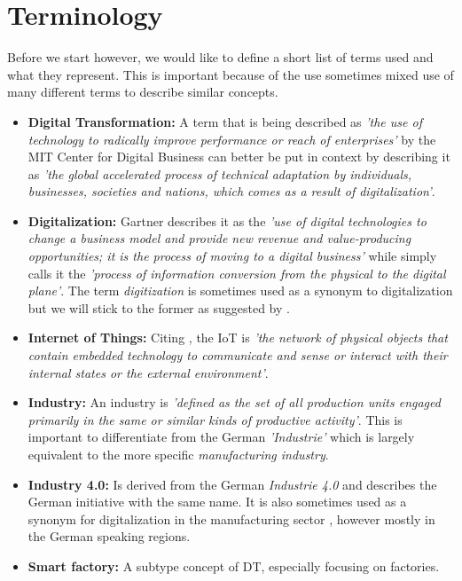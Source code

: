 \section{Terminology}
Before we start however, we would like to define a short list of terms used and what they represent. This is important because of the use sometimes mixed use of many different terms to describe similar concepts.



\begin{itemize}
  \item \textbf{Digital Transformation:} A term that is being described as \emph{'the use of technology to radically improve performance or reach of enterprises'}\cite{westerman2011digital} by the MIT Center for Digital Business can better be put in context by describing it as \emph{'the global accelerated process of technical adaptation by individuals, businesses, societies and nations, which comes as a result of digitalization'}\cite{bonnect2014leading,khan-digital:2016}.

  \item \textbf{Digitalization:} Gartner describes it as the \emph{'use of digital technologies to change a business model and provide new revenue and value-producing opportunities; it is the process of moving to a digital business'} while \citeauthor{khan-digital:2016} simply calls it the \emph{'process of information conversion from the physical to the digital plane'}. The term \emph{digitization} is sometimes used as a synonym to digitalization but we will stick to the former as suggested by \citeauthor{khan-digital:2016}.

  \item \textbf{Internet of Things:} Citing \citeauthor{iot-def:2016}, the \ac{IoT} is \emph{'the network of physical objects that contain embedded technology to communicate and sense or interact with their internal states or the external environment'}.

  \item \textbf{Industry:} An industry is \emph{'defined as the set of all production units engaged primarily in the same or similar kinds of productive activity'}\cite{ISIC:2008}. This is important to differentiate from the German \emph{'Industrie'} which is largely equivalent to the more specific \emph{manufacturing industry}.


  \item  \textbf{Industry 4.0:} Is derived from the German \emph{Industrie 4.0} and describes the German initiative with the same name. It is also sometimes used as a synonym for digitalization in the manufacturing sector \cite{McKinseydigitizationIndustrialSector:2015}, however mostly in the German speaking regions.

  \item  \textbf{Smart factory:} A subtype concept of \ac{DT}, especially focusing on factories.
\end{itemize}
